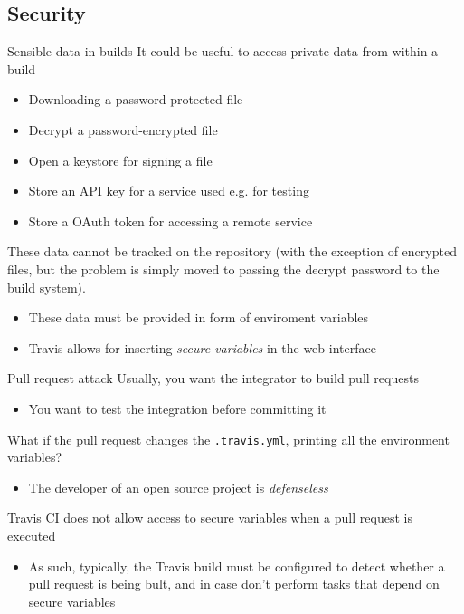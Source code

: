 \documentclass[presentation]{beamer}
\begin{document}
\subsection{Security}

\begin{frame}{Sensible data in builds}
    It could be useful to access private data from within a build
    \begin{itemize}
        \item Downloading a password-protected file
        \item Decrypt a password-encrypted file
        \item Open a keystore for signing a file
        \item Store an API key for a service used e.g. for testing
        \item Store a OAuth token for accessing a remote service
    \end{itemize}
    These data cannot be tracked on the repository (with the exception of encrypted files, but the problem is simply moved to passing the decrypt password to the build system).
    \begin{itemize}
        \item These data must be provided in form of enviroment variables
        \item Travis allows for inserting \textit{secure variables} in the web interface
    \end{itemize}
\end{frame}

\begin{frame}{Pull request attack}
    Usually, you want the integrator to build pull requests
    \begin{itemize}
        \item You want to test the integration before committing it
    \end{itemize}
    What if the pull request changes the \texttt{.travis.yml}, printing all the environment variables?
    \begin{itemize}
        \item The developer of an open source project is \textit{defenseless}
    \end{itemize}
    Travis CI does not allow access to secure variables when a pull request is executed
    \begin{itemize}
        \item As such, typically, the Travis build must be configured to detect whether a pull request is being bult, and in case don't perform tasks that depend on secure variables
    \end{itemize}
\end{frame}
\end{document}
